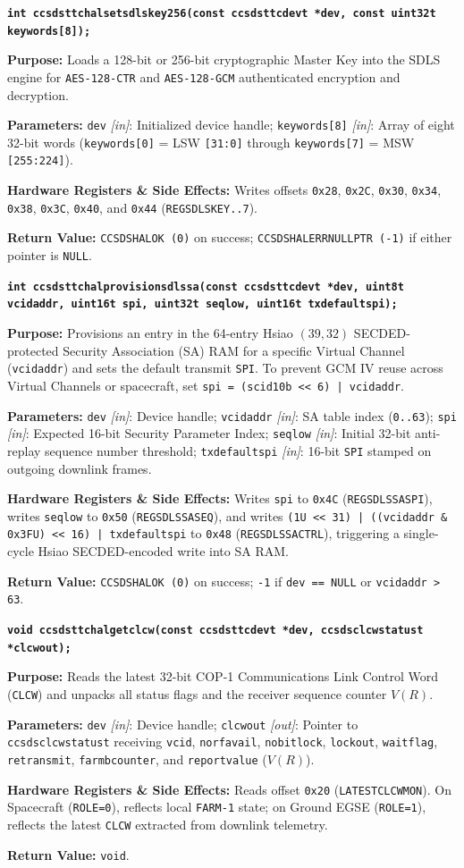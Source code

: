 \documentclass[10pt,a4paper]{article}
\renewcommand{\_}{\origunderscore\penalty0\hskip0pt\relax}
\newcommand{\apifunc}[5]{%
  \par\vspace{5pt}\noindent\colorbox{codebg}{%
    \parbox{\dimexpr\textwidth-2\fboxsep\relax}{%
      \vspace{3pt}\texttt{\bfseries\color{navy}#1}\vspace{3pt}%
    }%
  }\par\nopagebreak\vspace{2pt}%
  \noindent\textbf{Purpose:} #2\par\nopagebreak
  \noindent\textbf{Parameters:} #3\par\nopagebreak
  \noindent\textbf{Hardware Registers \& Side Effects:} #4\par\nopagebreak
  \noindent\textbf{Return Value:} #5\par\vspace{3pt}%
}
\numberwithin{table}{section}
\numberwithin{figure}{section}
\numberwithin{equation}{section}
\begin{document}
\apifunc{int ccsds\_ttc\_hal\_set\_sdls\_key256(const ccsds\_ttc\_dev\_t *dev, const uint32\_t key\_words[8]);}%
{Loads a 128-bit or 256-bit cryptographic Master Key into the SDLS engine for \texttt{AES-128-CTR} and \texttt{AES-128-GCM} authenticated encryption and decryption.}%
{\texttt{dev} \emph{[in]}: Initialized device handle; \texttt{key\_words[8]} \emph{[in]}: Array of eight 32-bit words (\texttt{key\_words[0]} = LSW \texttt{[31:0]} through \texttt{key\_words[7]} = MSW \texttt{[255:224]}).}%
{Writes offsets \texttt{0x28}, \texttt{0x2C}, \texttt{0x30}, \texttt{0x34}, \texttt{0x38}, \texttt{0x3C}, \texttt{0x40}, and \texttt{0x44} (\texttt{REG\_SDLS\_KEY\_0..7}).}%
{\texttt{CCSDS\_HAL\_OK (0)} on success; \texttt{CCSDS\_HAL\_ERR\_NULL\_PTR (-1)} if either pointer is \texttt{NULL}.}

\apifunc{int ccsds\_ttc\_hal\_provision\_sdls\_sa(const ccsds\_ttc\_dev\_t *dev, uint8\_t vcid\_addr, uint16\_t spi, uint32\_t seq\_low, uint16\_t tx\_default\_spi);}%
{Provisions an entry in the 64-entry Hsiao $(39,32)$ SECDED-protected Security Association (SA) RAM for a specific Virtual Channel (\texttt{vcid\_addr}) and sets the default transmit \texttt{SPI}. To prevent GCM IV reuse across Virtual Channels or spacecraft, set \texttt{spi = (scid\_10b << 6) | vcid\_addr}.}%
{\texttt{dev} \emph{[in]}: Device handle; \texttt{vcid\_addr} \emph{[in]}: SA table index (\texttt{0..63}); \texttt{spi} \emph{[in]}: Expected 16-bit Security Parameter Index; \texttt{seq\_low} \emph{[in]}: Initial 32-bit anti-replay sequence number threshold; \texttt{tx\_default\_spi} \emph{[in]}: 16-bit \texttt{SPI} stamped on outgoing downlink frames.}%
{Writes \texttt{spi} to \texttt{0x4C} (\texttt{REG\_SDLS\_SA\_SPI}), writes \texttt{seq\_low} to \texttt{0x50} (\texttt{REG\_SDLS\_SA\_SEQ}), and writes \texttt{(1U << 31) | ((vcid\_addr \& 0x3FU) << 16) | tx\_default\_spi} to \texttt{0x48} (\texttt{REG\_SDLS\_SA\_CTRL}), triggering a single-cycle Hsiao SECDED-encoded write into SA RAM.}%
{\texttt{CCSDS\_HAL\_OK (0)} on success; \texttt{-1} if \texttt{dev == NULL} or \texttt{vcid\_addr > 63}.}

\apifunc{void ccsds\_ttc\_hal\_get\_clcw(const ccsds\_ttc\_dev\_t *dev, ccsds\_clcw\_status\_t *clcw\_out);}%
{Reads the latest 32-bit COP-1 Communications Link Control Word (\texttt{CLCW}) and unpacks all status flags and the receiver sequence counter $V(R)$.}%
{\texttt{dev} \emph{[in]}: Device handle; \texttt{clcw\_out} \emph{[out]}: Pointer to \texttt{ccsds\_clcw\_status\_t} receiving \texttt{vcid}, \texttt{no\_rf\_avail}, \texttt{no\_bit\_lock}, \texttt{lockout}, \texttt{wait\_flag}, \texttt{retransmit}, \texttt{farm\_b\_counter}, and \texttt{report\_value} ($V(R)$).}%
{Reads offset \texttt{0x20} (\texttt{LATEST\_CLCW\_MON}). On Spacecraft (\texttt{ROLE=0}), reflects local \texttt{FARM-1} state; on Ground EGSE (\texttt{ROLE=1}), reflects the latest \texttt{CLCW} extracted from downlink telemetry.}%
{\texttt{void}.}
\end{document}
